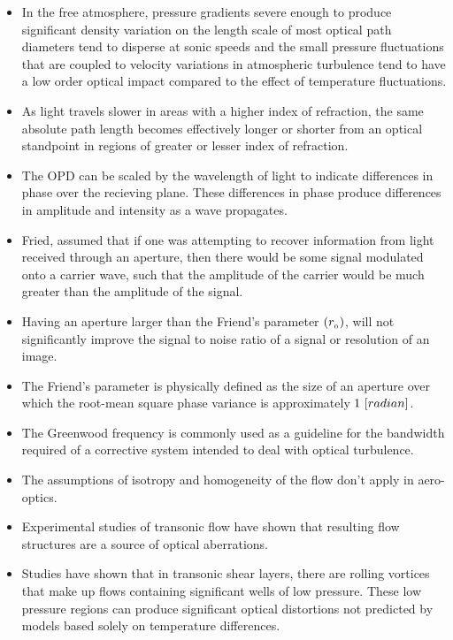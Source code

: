 \begin{itemize}
            \item In the free atmosphere, pressure gradients severe enough to produce significant density variation on the length scale of most optical path diameters tend to disperse at sonic speeds and the small pressure fluctuations that are coupled to velocity variations in atmospheric turbulence tend to have a low order optical impact compared to the effect of temperature fluctuations.  
            \item As light travels slower in areas with a higher index of refraction, the same absolute path length becomes effectively longer or shorter from an optical standpoint in regions of greater or lesser index of refraction.
            \item The OPD can be scaled by the wavelength of light to indicate differences in phase over the recieving plane. These differences in phase produce differences in amplitude and intensity as a wave propagates.
            \item Fried, assumed that if one was attempting to recover information from light received through an aperture, then there would be some signal modulated onto a carrier wave, such that the amplitude of the carrier would be much greater than the amplitude of the signal. 
            \item Having an aperture larger than the Friend's parameter $\left(r_{_{0}}\right)$, will not significantly improve the signal to noise ratio of a signal or resolution of an image. 
            \item The Friend's parameter is physically defined as the size of an aperture over which the root-mean square phase variance is approximately $1\,\left[radian\right]$.
            \item The Greenwood frequency is commonly used as a guideline for the bandwidth required of a corrective system intended to deal with optical turbulence.
            \item The assumptions of isotropy and homogeneity of the flow don't apply in aero-optics.
            \item Experimental studies of transonic flow have shown that resulting flow structures are a source of optical aberrations.  
            \item Studies have shown that in transonic shear layers, there are rolling vortices that make up flows containing significant wells of low pressure. These low pressure regions can produce significant optical distortions not predicted by models based solely on temperature differences.  

\end{itemize}
